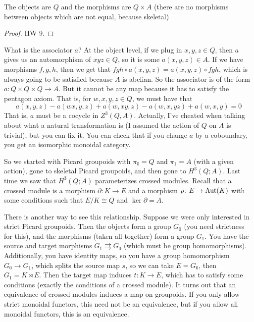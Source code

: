 The objects are $Q$ and the morphisms are $Q\times A$ (there are no morphisms between objects which are not equal, because skeletal)
\begin{proof}
 HW 9.
\end{proof}
What is the associator $a$? At the object level, if we plug in $x,y,z\in Q$, then $a$ gives us an automorphism of $xyz\in Q$, so it is some $a(x,y,z)\in A$. If we have morphisms $f,g,h$, then we get that $fgh\circ a(x,y,z)=a(x,y,z)\circ fgh$, which is always going to be satisfied because $A$ is abelian. So the associator is of the form $a\colon Q\times Q\times Q\to A$. But it cannot be any map because it has to satisfy the pentagon axiom. That is, for $w,x,y,z\in Q$, we must have that
\[
 a(x,y,z)-a(wx,y,z)+a(w,xy,z)-a(w,x,yz)+a(w,x,y)=0
\]
That is, $a$ must be a cocycle in $Z^3(Q,A)$. Actually, I've cheated when talking about what a natural transformation is (I assumed the action of $Q$ on $A$ is trivial), but you can fix it. You can check that if you change $a$ by a coboundary, you get an isomorphic monoidal category.

So we started with Picard groupoids with $\pi_0=Q$ and $\pi_1=A$ (with a given action), gone to skeletal Picard groupoids, and then gone to $H^3(Q;A)$. Last time we saw that $H^3(Q;A)$ parameterizes crossed modules. Recall that a crossed module is a morphism $\partial\colon K\to E$ and a morphism $\rho\colon E\to \operatorname{Aut}(K)$ with some conditions such that $E/K\cong Q$ and $\ker \partial =A$.

There is another way to see this relationship. Suppose we were only interested in strict Picard groupoids. Then the objects form a group $G_0$ (you need strictness for this), and the morphisms (taken all together) form a group $G_1$. You have the source and target morphisms $G_1\rightrightarrows G_0$ (which must be group homomorphisms). Additionally, you have identity maps, so you have a group homomorphism $G_0\to G_1$, which splits the source map $s$, so we can take $E=G_0$, then $G_1=K\rtimes E$. Then the target map induces $t\colon K\to E$, which has to satisfy some conditions (exactly the conditions of a crossed module). It turns out that an equivalence of crossed modules induces a map on groupoids. If you only allow strict monoidal functors, this need not be an equivalence, but if you allow all monoidal functors, this is an equivalence.







